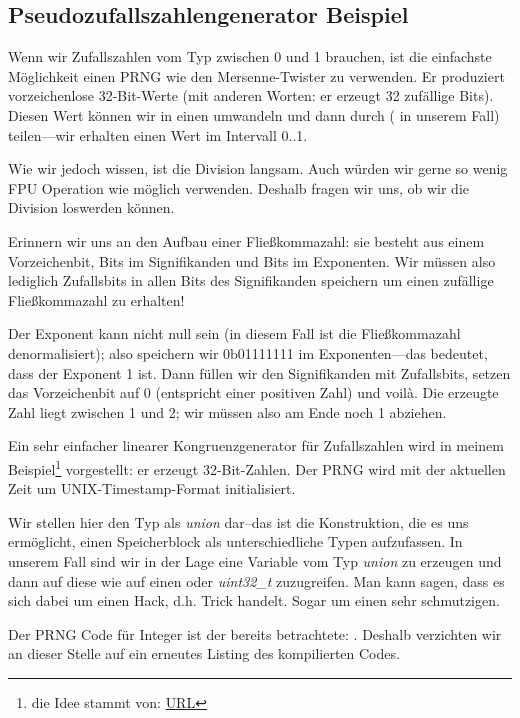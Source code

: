 \subsection{Pseudozufallszahlengenerator Beispiel}
\label{FPU_PRNG}
Wenn wir Zufallszahlen vom Typ \Tfloat zwischen 0 und 1 brauchen, ist die einfachste Möglichkeit einen \ac{PRNG} wie den
Mersenne-Twister zu verwenden.
Er produziert vorzeichenlose 32-Bit-Werte (mit anderen Worten: er erzeugt 32 zufällige Bits).
Diesen Wert können wir in einen \Tfloat umwandeln und dann durch  ( in unserem Fall)
teilen---wir erhalten einen Wert im Intervall 0..1.

Wie wir jedoch wissen, ist die Division langsam.
Auch würden wir gerne so wenig FPU Operation wie möglich verwenden.
Deshalb fragen wir uns, ob wir die Division loswerden können.

Erinnern wir uns an den Aufbau einer Fließkommazahl: sie besteht aus einem Vorzeichenbit, Bits im Signifikanden und Bits
im Exponenten.
Wir müssen also lediglich Zufallsbits in allen Bits des Signifikanden speichern um einen zufällige Fließkommazahl zu
erhalten!

Der Exponent kann nicht null sein (in diesem Fall ist die Fließkommazahl denormalisiert); also speichern wir 0b01111111
im Exponenten---das bedeutet, dass der Exponent 1 ist.
Dann füllen wir den Signifikanden mit Zufallsbits, setzen das Vorzeichenbit auf 0 (entspricht einer positiven Zahl) und
voilà.
Die erzeugte Zahl liegt zwischen 1 und 2; wir müssen also am Ende noch 1 abziehen.

\newcommand{\URLXOR}{\href{http://xor0110.wordpress.com/2010/09/24/how-to-generate-floating-point-random-numbers-efficiently/}{URL}}

Ein sehr einfacher linearer Kongruenzgenerator für Zufallszahlen wird in meinem Beispiel\footnote{die Idee stammt von:
\URLXOR} vorgestellt: er erzeugt 32-Bit-Zahlen.
Der \ac{PRNG} wird mit der aktuellen Zeit um UNIX-Timestamp-Format initialisiert.

Wir stellen hier den Typ \Tfloat als \emph{union} dar--das ist die \CCpp Konstruktion, die es uns ermöglicht, einen
Speicherblock als unterschiedliche Typen aufzufassen.
In unserem Fall sind wir in der Lage eine Variable vom Typ \emph{union} zu erzeugen und dann auf diese wie auf einen
\Tfloat oder \emph{uint32\_t} zuzugreifen.
Man kann sagen, dass es sich dabei um einen Hack, d.h. Trick handelt. Sogar um einen sehr schmutzigen.

Der \ac{PRNG} Code für Integer ist der bereits betrachtete: .
Deshalb verzichten wir an dieser Stelle auf ein erneutes Listing des kompilierten Codes.

